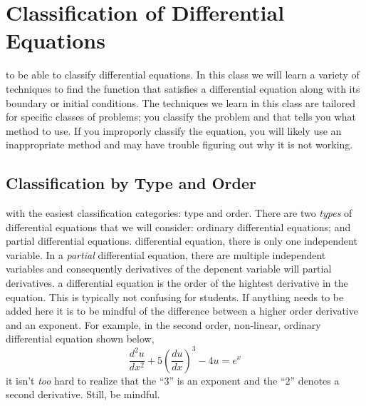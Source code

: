 \section{Classification of Differential Equations}
 to be able to classify differential equations.  In this class we will learn a variety of techniques to find the function that satisfies a differential equation along with its boundary or initial conditions. The techniques we learn in this class are tailored for specific classes of problems; you classify the problem and that tells you what method to use.  If you improporly classify the equation, you will likely use an inappropriate method and may have trouble figuring out why it is not working.  
\subsection{Classification by Type and Order}
 with the easiest classification categories: type and order.  There are two \emph{types} of differential equations that we will consider: ordinary differential equations; and partial differential equations.  
 differential equation, there is only one independent variable.  In a \emph{partial} differential equation, there are multiple independent variables and consequently derivatives of the depenent variable will partial derivatives.
 a differential equation is the order of the hightest derivative in the equation.  This is typically not confusing for students. If anything needs to be added here it is to be mindful of the difference between a higher order derivative and an exponent.  For example, in the second order, non-linear, ordinary differential equation shown below, 
$$ \frac{d^2u}{dx^2}+5\left(\frac{du}{dx} \right)^3 - 4u = e^{x}  $$
it isn't \emph{too} hard to realize that the ``3'' is an exponent and the ``2'' denotes a second derivative. Still, be mindful.   

